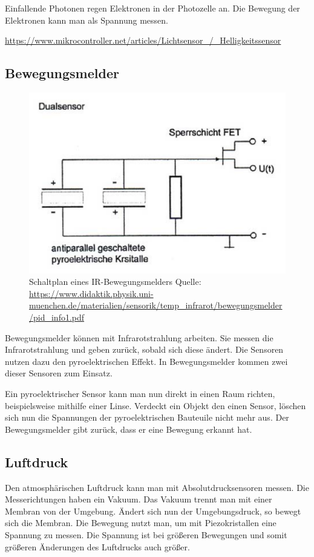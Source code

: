 Einfallende Photonen regen Elektronen in der Photozelle an. Die Bewegung der Elektronen kann man als Spannung messen.

\url{https://www.mikrocontroller.net/articles/Lichtsensor_/_Helligkeitssensor}

\subsection{Bewegungsmelder}
\begin{figure}
\includegraphics[scale=0.4]{bilder/bewegungsmelder} 
\caption{Schaltplan eines IR-Bewegungsmelders Quelle: \url{https://www.didaktik.physik.uni-muenchen.de/materialien/sensorik/temp_infrarot/bewegungsmelder/pid_info1.pdf}}
\label{Bewegungsmelder}
\end{figure}
Bewegungsmelder können mit Infrarotstrahlung arbeiten. Sie messen die Infrarotstrahlung und geben zurück, sobald sich diese ändert. 
Die Sensoren nutzen dazu den pyroelektrischen Effekt. In Bewegungsmelder kommen zwei dieser Sensoren zum Einsatz.   



Ein pyroelektrischer Sensor kann man nun direkt in einen Raum richten, beispielsweise mithilfe einer Linse. Verdeckt ein Objekt den einen Sensor, löschen sich nun die Spannungen der pyroelektrischen Bauteuile nicht mehr aus. Der Bewegungsmelder gibt zurück, dass er eine Bewegung erkannt hat. 


\subsection{Luftdruck}
Den atmosphärischen Luftdruck kann man mit Absolutdrucksensoren messen. Die Messerichtungen haben ein Vakuum. Das Vakuum trennt man mit einer Membran von der Umgebung. Ändert sich nun der Umgebungsdruck, so bewegt sich die Membran. Die Bewegung nutzt man, um mit Piezokristallen eine Spannung zu messen. Die Spannung ist bei größeren Bewegungen und somit größeren Änderungen des Luftdrucks auch größer.

